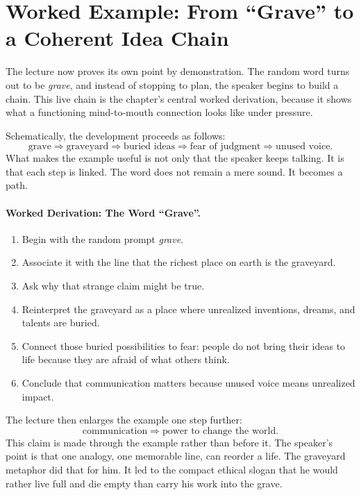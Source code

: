 \section{Worked Example: From ``Grave'' to a Coherent Idea Chain}

The lecture now proves its own point by demonstration. The random word turns out to be \emph{grave}, and instead of stopping to plan, the speaker begins to build a chain. This live chain is the chapter's central worked derivation, because it shows what a functioning mind-to-mouth connection looks like under pressure.

Schematically, the development proceeds as follows:
\begin{equation}
\text{grave} \Longrightarrow \text{graveyard} \Longrightarrow \text{buried ideas} \Longrightarrow \text{fear of judgment} \Longrightarrow \text{unused voice}.
\end{equation}
What makes the example useful is not only that the speaker keeps talking. It is that each step is linked. The word does not remain a mere sound. It becomes a path.

\paragraph{Worked Derivation: The Word ``Grave''.}
\begin{enumerate}
\item Begin with the random prompt \emph{grave}.
\item Associate it with the line that the richest place on earth is the graveyard.
\item Ask why that strange claim might be true.
\item Reinterpret the graveyard as a place where unrealized inventions, dreams, and talents are buried.
\item Connect those buried possibilities to fear: people do not bring their ideas to life because they are afraid of what others think.
\item Conclude that communication matters because unused voice means unrealized impact.
\end{enumerate}

The lecture then enlarges the example one step further:
\begin{equation}
\text{communication} \Longrightarrow \text{power to change the world}.
\end{equation}
This claim is made through the example rather than before it. The speaker's point is that one analogy, one memorable line, can reorder a life. The graveyard metaphor did that for him. It led to the compact ethical slogan that he would rather live full and die empty than carry his work into the grave.

